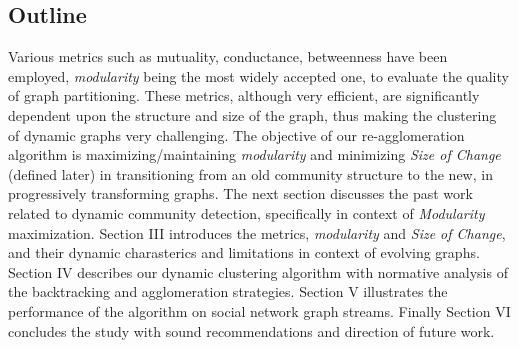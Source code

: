 \documentclass[conference]{IEEEtran}
\begin{document}
\subsection{Outline}
Various metrics such as mutuality, conductance, betweenness have been employed, 
\emph{modularity} being the most widely accepted one, to evaluate the quality of 
graph partitioning. These metrics, although very efficient, are significantly 
dependent upon the structure and size of the graph, thus making the clustering 
of dynamic graphs very challenging. The objective of our re-agglomeration 
algorithm is maximizing/maintaining \emph{modularity} and minimizing \emph{Size 
of Change} (defined later) in transitioning from an old community structure to 
the new, in progressively transforming graphs. The next section discusses the 
past work related to dynamic community detection, specifically in context 
of \emph{Modularity} maximization. Section III introduces the metrics, 
\emph{modularity} and \emph{Size of Change}, and their dynamic charasterics and 
limitations in context of evolving graphs. Section IV describes our dynamic 
clustering algorithm with normative analysis of the backtracking and 
agglomeration strategies. Section V illustrates the performance of the algorithm 
on social network graph streams. Finally Section VI concludes the study with 
sound recommendations and direction of future work.
\end{document}
